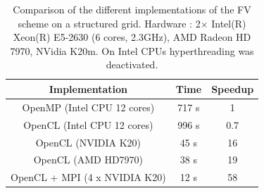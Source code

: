 \documentclass[12pt]{amsart}
\begin{document}
%
%
%
%
\begin{table}
\begin{tabular}{|c|c|c|}
\hline
Implementation & Time & Speedup\tabularnewline
\hline
\hline
OpenMP (Intel CPU 12 cores) & 717 s & 1\tabularnewline
\hline
OpenCL (Intel CPU 12 cores) & 996 s & 0.7\tabularnewline
\hline
OpenCL (NVIDIA K20) & 45 s & 16\tabularnewline
\hline
OpenCL (AMD HD7970) & 38 s & 19\tabularnewline
\hline
OpenCL + MPI (4 x NVIDIA K20) & 12 s & 58\tabularnewline
\hline
\end{tabular}
 \caption{Comparison of the different implementations of the FV scheme on a
   structured grid. Hardware : 2$\times$  Intel(R) Xeon(R) E5-2630 (6 cores, 2.3GHz), AMD
   Radeon HD 7970, NVidia K20m. On Intel CPUs hyperthreading was deactivated. \label{fv-speedup}}
\end{table}
\end{document}
